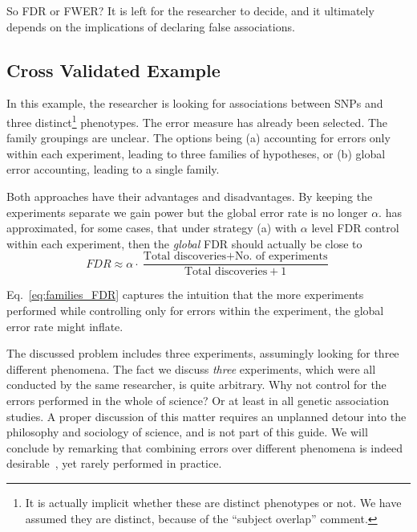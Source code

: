 \documentclass[review,12pt]{article}
\theoremstyle{definition}
\theoremstyle{definition}
\begin{document}
So FDR or FWER? It is left for the researcher to decide, and it ultimately depends on the implications of declaring false associations. 





\subsection{\label{sec:cross_validated}Cross Validated Example}

In this example, the researcher is looking for associations between SNPs and three distinct\footnote{ It is actually implicit whether these are distinct phenotypes or not. We have assumed they are distinct, because of the ``subject overlap'' comment.} phenotypes. The error measure has already been selected. The family groupings are unclear. 
The options being (a) accounting for errors only within each experiment, leading to three families of hypotheses, or (b) global error accounting, leading to a single family. 

Both approaches have their advantages and disadvantages. 
By keeping the experiments separate we gain power but the global error rate is no longer $\alpha$. \citet{yekutieli_hierarchical_2008} has approximated, for some cases, that under strategy (a) with $\alpha$ level FDR control within each experiment, then the \emph{global} FDR should actually be close to 
\begin{equation} 
	FDR \approx \alpha \cdot \frac{\text{Total discoveries} + 
	\text{No. of experiments}}{\text{Total discoveries}+1} \label{eq:families_FDR}
\end{equation}

Eq.~\ref{eq:families_FDR} captures the intuition that the more experiments performed while controlling only for errors within the experiment, the global error rate might inflate. 

The discussed problem includes three experiments, assumingly looking for three different phenomena. The fact we discuss \emph{three} experiments, which were all conducted by the same researcher, is quite arbitrary. Why not control for the errors performed in the whole of science? Or at least in all genetic association studies. 
A proper discussion of this matter requires an unplanned detour into the philosophy and sociology of science, and is not part of this guide. 
We will conclude by remarking that combining errors over different phenomena is indeed  desirable~\cite{ioannidis_why_2005}, yet rarely performed in practice. 
\end{document}
